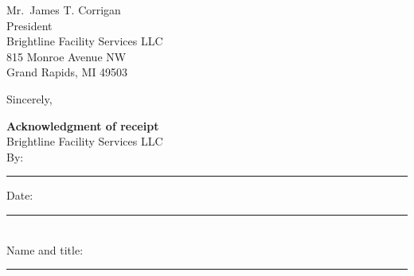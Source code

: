 \documentclass[11pt]{letter}
\begin{document}
\begin{letter}{Mr.\ James T. Corrigan\\
President\\
Brightline Facility Services LLC\\
815 Monroe Avenue NW\\
Grand Rapids, MI 49503}
\closing{Sincerely,}



\vspace{2\baselineskip}
\noindent\textbf{Acknowledgment of receipt}\\[0.5\baselineskip]
Brightline Facility Services LLC\\[1.5\baselineskip]
By: \rule{6cm}{0.4pt} \qquad Date: \rule{3.5cm}{0.4pt}\\[2pt]
Name and title: \rule{5cm}{0.4pt}

\end{letter}
\end{document}
